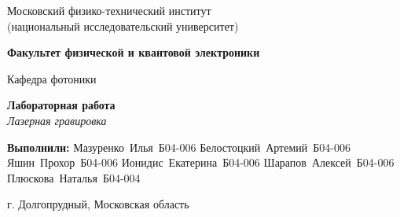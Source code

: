 \documentclass[a4paper]{article}
\begin{document}
\begin{titlepage}
  \begin{center}
    \large
    Московский физико-технический институт \\ (национальный исследовательский университет)
     
    \vspace{0.75cm}
     
    \textbf{Факультет физической и квантовой электроники}
     
    Кафедра фотоники
    \vfill
    
    \Large
    \textbf{Лабораторная работа} \\
    \textit{Лазерная гравировка} \\
     
    \vfill
\end{center}

\vbox{
\hfill
\vbox{
\hbox{\textbf{Выполнили:}}
\hbox{Мазуренко Илья Б04-006}
\hbox{Белостоцкий Артемий Б04-006}
\hbox{Яшин Прохор Б04-006}
\hbox{Ионидис Екатерина Б04-006}
\hbox{Шарапов Алексей Б04-006}
\hbox{Плюскова Наталья Б04-004}
%
}%
} 


\vfill
 
\begin{center}
    г. Долгопрудный, Московская область \\
\end{center}
\end{titlepage}

\newpage

\tableofcontents
\newpage








\newpage



%
\end{document}
